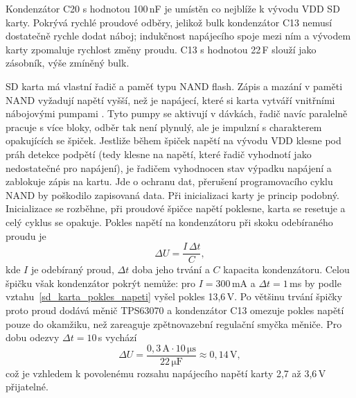 Kondenzátor C20 s hodnotou 100\,nF je umístěn co nejblíže k vývodu VDD SD karty. Pokrývá rychlé proudové odběry, jelikož bulk kondenzátor C13 nemusí dostatečně rychle dodat náboj; indukčnost napájecího spoje mezi ním a vývodem karty zpomaluje rychlost změny proudu. C13 s hodnotou 22\,\textmu F slouží jako zásobník, výše zmíněný bulk.


SD karta má vlastní řadič a paměť typu NAND flash. Zápis a mazání v paměti NAND vyžadují napětí vyšší, než je napájecí, které si karta vytváří vnitřními nábojovými pumpami \cite[kap.~11]{micheloni_nand}. Tyto pumpy se aktivují v dávkách, řadič navíc paralelně pracuje s více bloky, odběr tak není plynulý, ale je impulzní s charakterem opakujících se špiček. Jestliže během špiček napětí na vývodu VDD klesne pod práh detekce podpětí (tedy klesne na napětí, které řadič vyhodnotí jako nedostatečné pro napájení), je řadičem vyhodnocen stav výpadku napájení a zablokuje zápis na kartu. Jde o ochranu dat, přerušení programovacího cyklu NAND by poškodilo zapisovaná data. Při inicializaci karty je princip podobný. Inicializace se rozběhne, při proudové špičce napětí poklesne, karta se resetuje a celý cyklus se opakuje. Pokles napětí na kondenzátoru při skoku odebíraného proudu je 
\begin{equation}
    \Delta U = \frac{I\,\Delta t}{C},
    \label{sd_karta_pokles_napeti}
\end{equation} kde $I$ je odebíraný proud, $\Delta t$ doba jeho trvání
a $C$ kapacita kondenzátoru. Celou špičku však kondenzátor pokrýt nemůže: pro
$I = 300$\,mA a $\Delta t = 1$\,ms by podle vztahu~\eqref{sd_karta_pokles_napeti} vyšel pokles 13,6\,V. Po většinu trvání špičky proto proud dodává měnič TPS63070 a kondenzátor C13 omezuje pokles napětí pouze do okamžiku, než zareaguje zpětnovazební regulační smyčka měniče. Pro dobu odezvy $\Delta t = 10$\,\textmu s vychází
\begin{equation}
    \Delta U = \frac{0{,}3\,\mathrm{A} \cdot
    10\,\mathrm{\mu s}}{22\,\mathrm{\mu F}}
    \approx 0{,}14\,\mathrm{V},
    \label{sd_karta_pokles_vypocet}
\end{equation}
což je vzhledem k povolenému rozsahu napájecího napětí karty 2,7 až 3,6\,V přijatelné.

